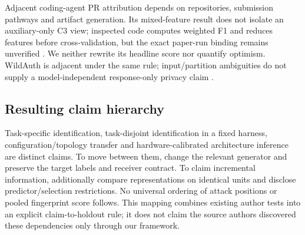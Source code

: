 Adjacent coding-agent PR attribution depends on repositories, submission pathways and artifact generation. Its mixed-feature result does not isolate an auxiliary-only C3 view; inspected code computes weighted F1 and reduces features before cross-validation, but the exact paper-run binding remains unverified \cite{ghaleb2026codingfingerprint}. We neither rewrite its headline score nor quantify optimism. WildAuth is adjacent under the same rule; input/partition ambiguities do not supply a model-independent response-only privacy claim \cite{wang2026dialogue}.

\subsection{Resulting claim hierarchy}
Task-specific identification, task-disjoint identification in a fixed harness, configuration/topology transfer and hardware-calibrated architecture inference are distinct claims. To move between them, change the relevant generator and preserve the target labels and receiver contract. To claim incremental information, additionally compare representations on identical units and disclose predictor/selection restrictions. No universal ordering of attack positions or pooled fingerprint score follows. This mapping combines existing author tests into an explicit claim-to-holdout rule; it does not claim the source authors discovered these dependencies only through our framework.
